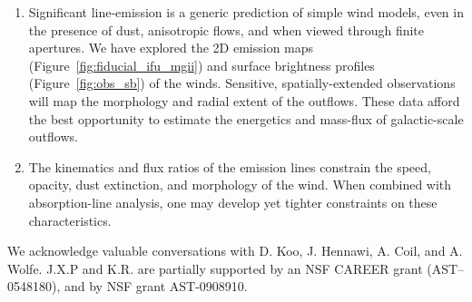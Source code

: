 \documentclass[]{emulateapj}
\begin{document}
\begin{enumerate}

\item Significant line-emission is a generic prediction of simple wind
  models, even in the presence of dust, anisotropic flows, and when
  viewed through finite apertures.  We have explored the 2D emission
  maps (Figure~\ref{fig:fiducial_ifu_mgii}) and surface brightness 
  profiles (Figure~\ref{fig:obs_sb}) of
  the winds.  Sensitive, spatially-extended observations will map the
  morphology and radial extent of the outflows.  These data afford the
  best opportunity to estimate the energetics and mass-flux of
  galactic-scale outflows.

\item The kinematics and flux ratios of the emission lines 
  constrain the %
  speed, opacity, dust extinction, and morphology of the
  wind.  When combined with absorption-line analysis, one may develop
  yet tighter constraints on these characteristics.



\end{enumerate}

\acknowledgments

We acknowledge valuable conversations with D. Koo, J. Hennawi,
A. Coil, and A. Wolfe. 
J.X.P and K.R. are partially supported
by an NSF CAREER grant (AST--0548180), and 
by NSF grant AST-0908910.


%
%
%
%
\end{document}

